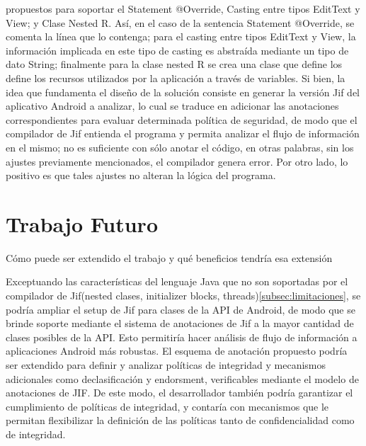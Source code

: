 propuestos para soportar el Statement @Override, Casting entre tipos EditText y
View; y Clase Nested R. Así, en el caso de  la sentencia Statement @Override, se
comenta la línea que lo contenga; para el casting entre tipos EditText y View,
la información implicada en este tipo de casting es abstraída mediante un tipo
de dato String; finalmente para la clase nested R se crea una clase que define
los define los recursos utilizados por la aplicación a través de
variables.\newline 
Si bien, la idea que fundamenta el diseño de la solución consiste en generar la
versión Jif del aplicativo Android a analizar, lo cual se traduce en adicionar
las anotaciones correspondientes para evaluar determinada política de seguridad,
de modo que el compilador de Jif entienda el programa y permita analizar el
flujo de información en el mismo; no es suficiente con sólo anotar el código, en
otras palabras, sin los ajustes previamente mencionados, el compilador genera
error. Por otro lado, lo positivo es que tales ajustes no alteran la lógica del
programa.


\section{Trabajo Futuro}
Cómo puede ser extendido el trabajo y qué beneficios tendría esa
extensión\newline

Exceptuando las características del lenguaje Java que no son soportadas por el
compilador de Jif(nested clases, initializer blocks,
threads)\ref{subsec:limitaciones}, se podría ampliar el setup de Jif para clases
de la API de Android, de modo que se brinde soporte mediante el sistema de
anotaciones de Jif a la mayor cantidad de clases posibles de la API.
Esto permitiría hacer análisis de flujo de información a aplicaciones
Android más robustas.\newline 
El esquema de anotación propuesto podría ser extendido para definir y analizar
políticas de integridad y mecanismos adicionales como declasificación y
endorsment, verificables mediante el modelo de anotaciones de JIF. De este modo,
el desarrollador también podría garantizar el cumplimiento de políticas de
integridad, y contaría con mecanismos que le permitan flexibilizar la definición
de las políticas tanto de confidencialidad como de integridad.



